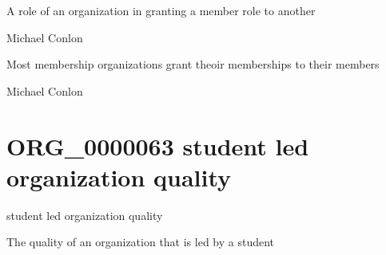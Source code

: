 \documentclass[letterpaper,10pt,english]{sphinxmanual}
\begin{document}
\begin{sphinxShadowBox}

\sphinxAtStartPar
A role of an organization in granting a member role to another
\end{sphinxShadowBox}

\begin{sphinxShadowBox}

\sphinxAtStartPar
Michael Conlon 
\end{sphinxShadowBox}

\begin{sphinxShadowBox}

\sphinxAtStartPar
Most membership organizations grant theoir memberships to their members
\end{sphinxShadowBox}

\begin{sphinxShadowBox}

\sphinxAtStartPar
Michael Conlon 
\end{sphinxShadowBox}
\begin{quote}
\label{\detokenize{doc-ORG_0000063:org-0000063}}\label{\detokenize{doc-ORG_0000063:student-led-organization-quality}}\label{\detokenize{doc-ORG_0000063:org-0000063}}
\ignorespaces \end{quote}


\section{ORG\_0000063 \sphinxhyphen{} student led organization quality}
\label{\detokenize{doc-ORG_0000063:org-0000063-student-led-organization-quality}}\label{\detokenize{doc-ORG_0000063:index-0}}\label{\detokenize{doc-ORG_0000063::doc}}
\begin{sphinxShadowBox}

\sphinxAtStartPar
student led organization quality
\end{sphinxShadowBox}

\begin{sphinxShadowBox}

\sphinxAtStartPar
The quality of an organization that is led by a student
\end{sphinxShadowBox}
\end{document}
